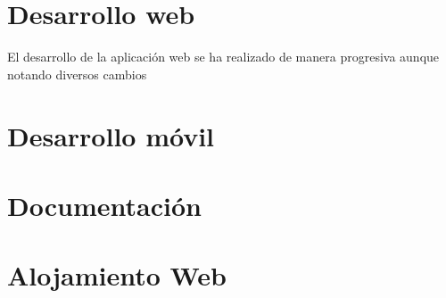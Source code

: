  
   
   \section{Desarrollo web}\label{dweb}
   
   El desarrollo de la aplicación web se ha realizado de manera progresiva aunque notando diversos cambios 
   
   \section{Desarrollo móvil}\label{dapp}
   
   \section{Documentación}\label{docs}
   
   \section{Alojamiento Web}\label{alojamiento}
 
 